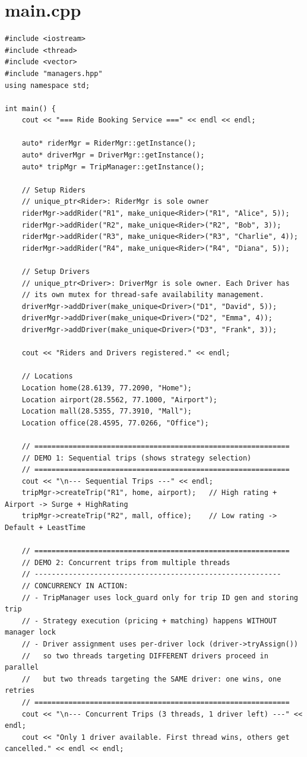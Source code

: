 \documentclass[11pt,a4paper]{article}
\begin{document}
\section{main.cpp}
\begin{lstlisting}[title={\texttt{main.cpp}}]
#include <iostream>
#include <thread>
#include <vector>
#include "managers.hpp"
using namespace std;

int main() {
    cout << "=== Ride Booking Service ===" << endl << endl;

    auto* riderMgr = RiderMgr::getInstance();
    auto* driverMgr = DriverMgr::getInstance();
    auto* tripMgr = TripManager::getInstance();

    // Setup Riders
    // unique_ptr<Rider>: RiderMgr is sole owner
    riderMgr->addRider("R1", make_unique<Rider>("R1", "Alice", 5));
    riderMgr->addRider("R2", make_unique<Rider>("R2", "Bob", 3));
    riderMgr->addRider("R3", make_unique<Rider>("R3", "Charlie", 4));
    riderMgr->addRider("R4", make_unique<Rider>("R4", "Diana", 5));

    // Setup Drivers
    // unique_ptr<Driver>: DriverMgr is sole owner. Each Driver has
    // its own mutex for thread-safe availability management.
    driverMgr->addDriver(make_unique<Driver>("D1", "David", 5));
    driverMgr->addDriver(make_unique<Driver>("D2", "Emma", 4));
    driverMgr->addDriver(make_unique<Driver>("D3", "Frank", 3));

    cout << "Riders and Drivers registered." << endl;

    // Locations
    Location home(28.6139, 77.2090, "Home");
    Location airport(28.5562, 77.1000, "Airport");
    Location mall(28.5355, 77.3910, "Mall");
    Location office(28.4595, 77.0266, "Office");

    // ============================================================
    // DEMO 1: Sequential trips (shows strategy selection)
    // ============================================================
    cout << "\n--- Sequential Trips ---" << endl;
    tripMgr->createTrip("R1", home, airport);   // High rating + Airport -> Surge + HighRating
    tripMgr->createTrip("R2", mall, office);    // Low rating -> Default + LeastTime

    // ============================================================
    // DEMO 2: Concurrent trips from multiple threads
    // ----------------------------------------------------------
    // CONCURRENCY IN ACTION:
    // - TripManager uses lock_guard only for trip ID gen and storing trip
    // - Strategy execution (pricing + matching) happens WITHOUT manager lock
    // - Driver assignment uses per-driver lock (driver->tryAssign())
    //   so two threads targeting DIFFERENT drivers proceed in parallel
    //   but two threads targeting the SAME driver: one wins, one retries
    // ============================================================
    cout << "\n--- Concurrent Trips (3 threads, 1 driver left) ---" << endl;
    cout << "Only 1 driver available. First thread wins, others get cancelled." << endl << endl;


\end{lstlisting}
\end{document}
